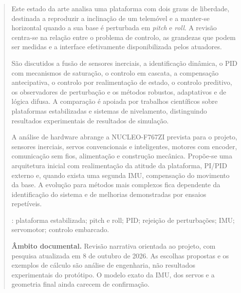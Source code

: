 \begin{abstract}
Este estado da arte analisa uma plataforma com dois graus de liberdade, destinada a reproduzir a inclinação de um telemóvel e a manter-se horizontal quando a sua base é perturbada em \textit{pitch} e \textit{roll}. A revisão centra-se na relação entre o problema de controlo, as grandezas que podem ser medidas e a interface efetivamente disponibilizada pelos atuadores.

São discutidos a fusão de sensores inerciais, a identificação dinâmica, o PID com mecanismos de saturação, o controlo em cascata, a compensação antecipativa, o controlo por realimentação de estado, o controlo preditivo, os observadores de perturbação e os métodos robustos, adaptativos e de lógica difusa. A comparação é apoiada por trabalhos científicos sobre plataformas estabilizadas e sistemas de nivelamento, distinguindo resultados experimentais de resultados de simulação.

A análise de hardware abrange a NUCLEO-F767ZI prevista para o projeto, sensores inerciais, servos convencionais e inteligentes, motores com encoder, comunicação sem fios, alimentação e construção mecânica. Propõe-se uma arquitetura inicial com realimentação da atitude da plataforma, PI/PID externo e, quando exista uma segunda IMU, compensação do movimento da base. A evolução para métodos mais complexos fica dependente da identificação do sistema e de melhorias demonstradas por ensaios repetíveis.

\vspace*{10mm}\noindent\textbf{\keywordslabel}: plataforma estabilizada; pitch e roll; PID; rejeição de perturbações; IMU; servomotor; controlo embarcado.

\medskip
\textbf{Âmbito documental.} Revisão narrativa orientada ao projeto, com pesquisa atualizada em 8 de outubro de 2026. As escolhas propostas e os exemplos de cálculo são análise de engenharia, não resultados experimentais do protótipo. O modelo exato da IMU, dos servos e a geometria final ainda carecem de confirmação.

\end{abstract}
